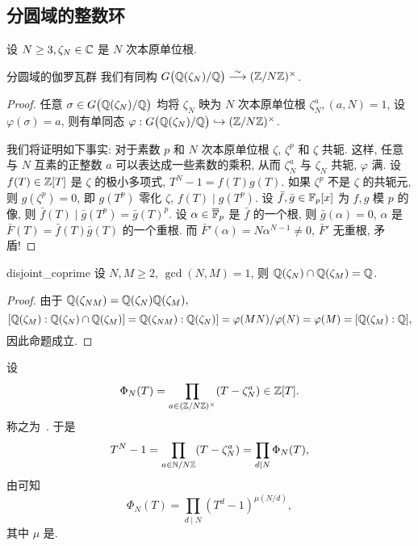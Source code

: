\subsection{分圆域的整数环}
设 $N\ge 3, \zeta_N\in{\mathbb{C}}$ 是 $N$ 次本原单位根.

\begin{proposition}{分圆域的伽罗瓦群}{}
我们有同构 $G\bigl({\mathbb{Q}}(\zeta_N)/{\mathbb{Q}}\bigr)\stackrel{\sim}{\longrightarrow} ({\mathbb{Z}}/N{\mathbb{Z}})^\times$.
\end{proposition}
\begin{proof}
任意 $\sigma\in G\bigl({\mathbb{Q}}(\zeta_N)/{\mathbb{Q}}\bigr)$ 均将 $\zeta_N$ 映为 $N$ 次本原单位根 $\zeta_N^a,(a,N)=1$, 设 $\varphi(\sigma)=a$, 则有单同态 $\varphi: G\bigl({\mathbb{Q}}(\zeta_N)/{\mathbb{Q}}\bigr)\hookrightarrow ({\mathbb{Z}}/N{\mathbb{Z}})^\times$.

我们将证明如下事实: 对于素数 $p$ 和 $N$ 次本原单位根 $\zeta$, $\zeta^p$ 和 $\zeta$ 共轭. 这样, 任意与 $N$ 互素的正整数 $a$ 可以表达成一些素数的乘积, 从而 $\zeta_N^a$ 与 $\zeta_N$ 共轭, $\varphi$ 满. 设 $f(T)\in{\mathbb{Z}}[T]$ 是 $\zeta$ 的极小多项式, $T^N-1=f(T)g(T)$. 如果 $\zeta^p$ 不是 $\zeta$ 的共轭元, 则 $g(\zeta^p)=0$, 即 $g(T^p)$ 零化 $\zeta$, $f(T)\mid g(T^p)$. 设 $\bar f,\bar g\in{\mathbb{F}}_p[x]$ 为 $f,g$ 模 $p$ 的像, 则 $\bar f(T)\mid \bar g(T^p)=\bar g(T)^p$. 设 $\alpha\in\overline{{\mathbb{F}}}_p$ 是 $\bar f$ 的一个根, 则 $\bar g(\alpha)=0$, $\alpha$ 是 $\bar F(T)=\bar f(T)\bar g(T)$ 的一个重根. 而 $\bar F'(\alpha)=N\alpha^{N-1}\neq 0$, $\bar F'$ 无重根, 矛盾! 
\end{proof}

\begin{corollary}{}{disjoint_coprime}
设 $N,M\ge 2$, $\gcd(N,M)=1$, 则 ${\mathbb{Q}}(\zeta_N)\cap {\mathbb{Q}}(\zeta_M)={\mathbb{Q}}$.
\end{corollary}
\begin{proof}
由于 ${\mathbb{Q}}(\zeta_{NM})={\mathbb{Q}}(\zeta_N){\mathbb{Q}}(\zeta_M),$
  \[[{\mathbb{Q}}(\zeta_M):{\mathbb{Q}}(\zeta_N)\cap {\mathbb{Q}}(\zeta_M)]={\mathbb{Q}}(\zeta_{NM}):{\mathbb{Q}}(\zeta_N)]=\varphi(MN)/\varphi(N)=\varphi(M)=[{\mathbb{Q}}(\zeta_M):{\mathbb{Q}}],\]
因此命题成立.
\end{proof}

设 
  \[\Phi_N(T)=\prod_{a\in({\mathbb{Z}}/N{\mathbb{Z}})^\times} (T-\zeta_N^a)\in{\mathbb{Z}}[T].\]
称之为\ . 于是
	\[T^N-1=\prod_{a\in{\mathbb{N}}/N{\mathbb{Z}}}(T-\zeta_N^a)=\prod_{d\mid N}\Phi_N(T),\]
由可知
	\[\Phi_N(T)=\prod_{d\mid N}(T^d-1)^{\mu(N/d)},\]
其中 $\mu$ 是.

